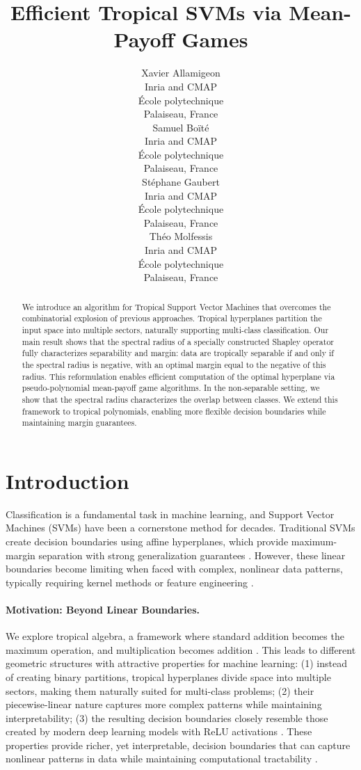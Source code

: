 \documentclass{article}
\title{Efficient Tropical SVMs via Mean-Payoff Games}
\author{
  Xavier Allamigeon \\
  Inria and CMAP \\
  École polytechnique \\
  Palaiseau, France \\
  \And
  Samuel Boïté \\
  Inria and CMAP \\
  École polytechnique \\
  Palaiseau, France \\
  \And
  Stéphane Gaubert \\
  Inria and CMAP \\
  École polytechnique \\
  Palaiseau, France \\
  \And
  Théo Molfessis \\
  Inria and CMAP \\
  École polytechnique \\
  Palaiseau, France \\
}
\begin{document}
\maketitle

\begin{abstract}
We introduce an algorithm for Tropical Support Vector Machines that overcomes the combinatorial explosion of previous approaches. Tropical hyperplanes partition the input space into multiple sectors, naturally supporting multi-class classification. Our main result shows that the spectral radius of a specially constructed Shapley operator fully characterizes separability and margin: data are tropically separable if and only if the spectral radius is negative, with an optimal margin equal to the negative of this radius. This reformulation enables efficient computation of the optimal hyperplane via pseudo-polynomial mean-payoff game algorithms. In the non-separable setting, we show that the spectral radius characterizes the overlap between classes. We extend this framework to tropical polynomials, enabling more flexible decision boundaries while maintaining margin guarantees.
\end{abstract}

\section{Introduction}\label{sec:intro}

Classification is a fundamental task in machine learning, and Support Vector Machines (SVMs) have been a cornerstone method for decades. Traditional SVMs create decision boundaries using affine hyperplanes, which provide maximum-margin separation with strong generalization guarantees \cite{vapnik1999}. However, these linear boundaries become limiting when faced with complex, nonlinear data patterns, typically requiring kernel methods or feature engineering \cite{scholkopf2002}.

\paragraph{Motivation: Beyond Linear Boundaries.} We explore tropical algebra, a framework where standard addition becomes the maximum operation, and multiplication becomes addition \cite{maclagan2015}. This leads to different geometric structures with attractive properties for machine learning: (1) instead of creating binary partitions, tropical hyperplanes divide space into multiple sectors, making them naturally suited for multi-class problems; (2) their piecewise-linear nature captures more complex patterns while maintaining interpretability; (3) the resulting decision boundaries closely resemble those created by modern deep learning models with ReLU activations \cite{zhang2018}. These properties provide richer, yet interpretable, decision boundaries that can capture nonlinear patterns in data while maintaining computational tractability \cite{maragos2021}.
\end{document}
